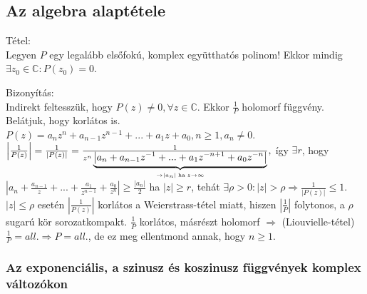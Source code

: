 \documentclass[12pt,a4paper]{scrartcl}
\newenvironment{tetel}{}{}
\newenvironment{bizonyitas}{}{}
\begin{document}
\hypertarget{az-algebra-alaptetele}{%
\subsection{Az algebra alaptétele}\label{az-algebra-alaptetele}}

\begin{tetel}

Tétel:\\
Legyen \(P\) egy legalább elsőfokú, komplex együtthatós polinom! Ekkor
mindig \(\exists z_{0} \in {\mathbb{C}}:P\left( z_{0} \right) = 0\).

\end{tetel}

\begin{bizonyitas}

Bizonyítás:\\
Indirekt feltesszük, hogy
\(P\left( z \right) \neq 0,\forall z \in {\mathbb{C}}\). Ekkor
\(\frac{1}{P}\) holomorf függvény. Belátjuk, hogy korlátos is.
\(P\left( z \right) = a_{n}z^{n} + a_{n - 1}z^{n - 1} + ... + a_{1}z + a_{0},n \geq 1,a_{n} \neq 0\).
\(\left| {\frac{1}{{P\left( z \right)}}} \right| = \frac{1}{{\left| {P\left( z \right)} \right|}} = \frac{1}{{{z^n}\underbrace {\left| {{a_n} + {a_{n - 1}}{z^{ - 1}} + ... + {a_1}{z^{ - n + 1}} + {a_0}{z^{ - n}}} \right|}_{ \to \left| {{a_n}} \right|{\text{\;ha\;}}z \to \infty }}},\)
így \(\exists r\), hogy
\(\left| {a_{n} + \frac{a_{n - 1}}{z} + ... + \frac{a_{1}}{z^{n - 1}} + \frac{a_{0}}{z^{n}}} \right| \geq \frac{\left| a_{n} \right|}{2}\)
ha \(\left| z \right| \geq r\), tehát
\(\left. \exists\rho > 0:\left| z \right| > \rho\Rightarrow\frac{1}{\left| {P\left( z \right)} \right|} \leq 1 \right.\).
\(\left| z \right| \leq \rho\) esetén
\(\left| \frac{1}{P\left( z \right)} \right|\) korlátos a
Weierstrass-tétel miatt, hiszen \(\left| \frac{1}{P} \right|\)
folytonos, a \(\rho\) sugarú kör sorozatkompakt. \(\frac{1}{P}\)
korlátos, másrészt holomorf \(\Rightarrow\) (Liouvielle-tétel)
\(\left. \frac{1}{P} = {all.}\Rightarrow P = {all.} \right.\), de ez meg
ellentmond annak, hogy \(n \geq 1\).

\end{bizonyitas}

\hypertarget{az-exponencialis-a-szinusz-es-koszinusz-fuggvenyek-komplex-valtozokon}{%
\subsubsection{Az exponenciális, a szinusz és koszinusz függvények
komplex
változókon}\label{az-exponencialis-a-szinusz-es-koszinusz-fuggvenyek-komplex-valtozokon}}
\end{document}
